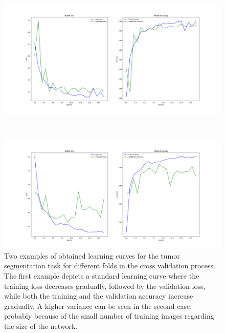 \begin{figure}[!ht]
	\centering
	\begin{minipage}{\linewidth}
		\includegraphics[width=\linewidth]{images/ResizelearningCurveTumorVE_pat4}
	\end{minipage} \\
	\begin{minipage}{\linewidth}
		\includegraphics[width=\linewidth]{images/ResizelearningCurveTumorVE_pat6}
	\end{minipage}
	\caption{Two examples of obtained learning curves for the tumor segmentation task for different folds in the cross validation process. The first example depicts a standard learning curve where the training loss decreases gradually, followed by the validation loss, while both the training and the validation accuracy increase gradually. A higher variance can be seen in the second case, probably because of the small number of training images regarding the size of the network.}
	\label{fig:learningCurvesIJCARS}
\end{figure}


